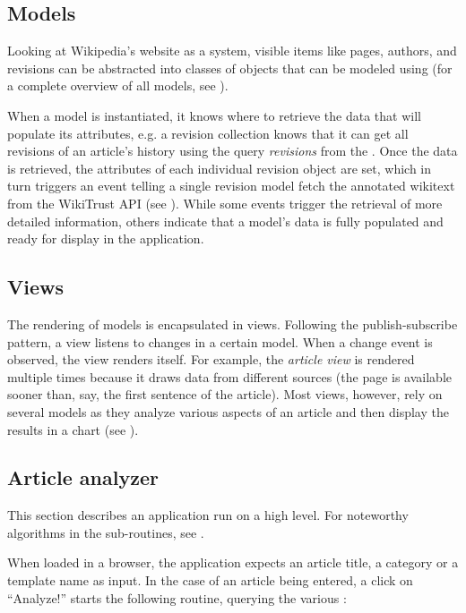 \subsection{Models}

Looking at Wikipedia's website as a system, visible items like pages, authors, and revisions can be abstracted into classes of objects that can be modeled using  (for a complete overview of  all models, see ).

When a model is instantiated, it knows where to retrieve the data that will populate its attributes, e.g. a revision collection knows that it can get all revisions of an article's history using the query \emph{revisions} from the  .
Once the data is retrieved, the attributes of each individual revision object are set, which in turn triggers an event telling a single revision model fetch the annotated wikitext from the WikiTrust \ac{API} (see ).
While some events trigger the retrieval of more detailed information, others indicate that a model's data is fully populated and ready for display in the application.

\subsection{Views}

The rendering of models is encapsulated in views.
Following the publish-subscribe pattern, a view listens to changes in a certain model.
When a change event is observed, the view renders itself.
For example, the \emph{article view} is rendered multiple times because it draws data from different sources (the page  is available sooner than, say, the first sentence of the article). 
Most views, however, rely on several models as they analyze various aspects of an article and then display the results in a chart (see ).

\subsection{Article analyzer}

This section describes an application run on a high level.
For noteworthy algorithms in the sub-routines, see .

When loaded in a browser, the application expects an article title, a category or a template name as input.
In the case of an article being entered, a click on ``Analyze!'' starts the following routine, querying the various :

